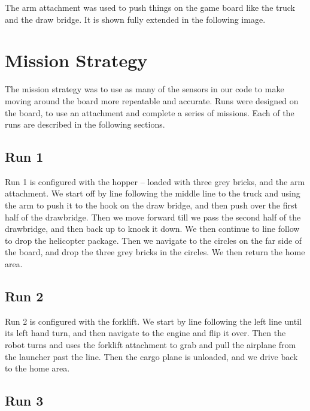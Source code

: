 \documentclass[letter, article]{article}
\begin{document}
The arm attachment was used to push things on the game board like the truck and the draw bridge.  It is shown fully extended in the following image.

\begin{center}
\end{center}

\section{Mission Strategy}

The mission strategy was to use as many of the sensors in our code to make moving around the board more repeatable and accurate.  Runs were designed on the board, to use an attachment and complete a series of missions.  Each of the runs are described in the following sections.

\subsection{Run 1}

Run 1 is configured with the hopper -- loaded with three grey bricks, and the arm attachment.  We start off by line following the middle line to the truck and using the arm to push it to the hook on the draw bridge, and then push over the first half of the drawbridge.  Then we move forward till we pass the second half of the drawbridge, and then back up to knock it down.  We then continue to line follow to drop the helicopter package.  Then we navigate to the circles on the far side of the board, and drop the three grey bricks in the circles.  We then return the home area.

\subsection{Run 2}

Run 2 is configured with the forklift.  We start by line following the left line until its left hand turn, and then navigate to the engine and flip it over.  Then the robot turns and uses the forklift attachment to grab and pull the airplane from the launcher past the line.  Then the cargo plane is unloaded, and we drive back to the home area.

\subsection{Run 3}
\end{document}

